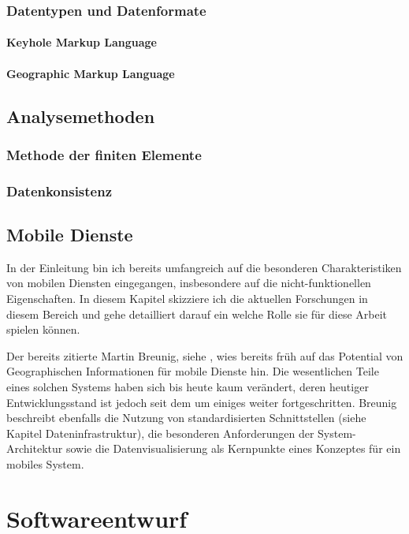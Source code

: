 \subsection{Datentypen und Datenformate}
\subsubsection{Keyhole Markup Language}
\subsubsection{Geographic Markup Language}

\section{Analysemethoden}
\subsection{Methode der finiten Elemente}
\subsection{Datenkonsistenz}


\section{Mobile Dienste}
In der Einleitung bin ich bereits umfangreich auf die besonderen Charakteristiken von mobilen Diensten eingegangen, insbesondere auf die nicht-funktionellen Eigenschaften. In diesem Kapitel skizziere ich die aktuellen Forschungen in diesem Bereich und gehe detailliert darauf ein welche Rolle sie für diese Arbeit spielen können.

Der bereits zitierte Martin Breunig, siehe \citep{breunig_entwicklung_2003}, wies bereits früh auf das Potential von Geographischen Informationen für mobile Dienste hin. Die wesentlichen Teile eines solchen Systems haben sich bis heute kaum verändert, deren heutiger Entwicklungsstand ist jedoch seit dem um einiges weiter fortgeschritten. Breunig beschreibt ebenfalls die Nutzung von standardisierten Schnittstellen (siehe Kapitel Dateninfrastruktur), die besonderen Anforderungen der System-Architektur sowie die Datenvisualisierung als Kernpunkte eines Konzeptes für ein mobiles System.


\chapter{Softwareentwurf}
